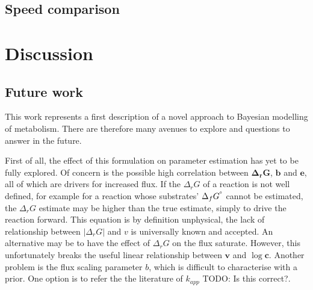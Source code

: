 \documentclass[10pt,letterpaper]{article}
\newcommand{\sdgf}{\Delta_fG^{\degree}}
\newcommand{\dgr}{\Delta_rG}
\newcommand{\bdgr}{\mathbf{\dgr}}
\newcommand{\be}{\mathbf{e}}
\newcommand{\bc}{\mathbf{c}}
\newcommand{\bb}{\mathbf{b}}
\newcommand{\bv}{\mathbf{v}}
\begin{document}
\subsection{Speed comparison}

\subsection{}

\section*{Discussion}





%

\subsection{Future work}

This work represents a first description of a novel approach to Bayesian modelling of metabolism.
There are therefore many avenues to explore and questions to answer in the future.

First of all, the effect of this formulation on parameter estimation has yet to be fully explored.
Of concern is the possible high correlation between $\bdgr$, $\bb$ and $\be$, all of which are drivers for increased flux.
If the $\dgr$ of a reaction is not well defined, for example for a reaction whose substrates' $\sdgf$ cannot be estimated, the $\dgr$ estimate may be higher than the true estimate, simply to drive the reaction forward.
This equation is by definition unphysical, the lack of relationship between $|\dgr|$ and $v$ is universally known and accepted.
An alternative may be to have the effect of $\dgr$ on the flux saturate.
However, this unfortunately breaks the useful linear relationship between $\bv$ and $\log{\bc}$.
Another problem is the flux scaling parameter $b$, which is difficult to characterise with a prior.
One option is to refer the the literature of $k_{app}$ {TODO: Is this correct?}.
\end{document}
